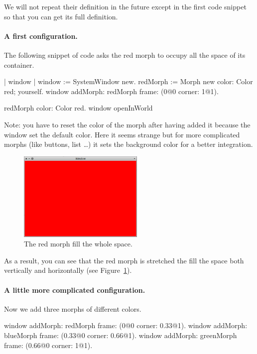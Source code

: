 \documentclass[a4paper,10pt,twoside]{book}
\begin{document}
We will not repeat their definition in the future except in the first code snippet so that you can 
get its full definition. 

\paragraph{A first configuration.}
The following snippet of code asks the red morph to occupy all the space of its container.
\begin{code}{}
| window |
window := SystemWindow new.
redMorph := Morph new color: Color red; yourself.	
window
	addMorph: redMorph
	frame: (0@0 corner: 1@1).
	
redMorph color: Color red.	
window openInWorld
\end{code}
Note: you have to reset the color of the morph after having added it because the window set the default color. Here it seems strange but for more complicated morphs (like buttons, list \dots) it sets the background color for a better integration.

\begin{figure}[ht]\centering
	\includegraphics[width=6cm]{SimpleLayoutExample1}
	\caption{The red morph fill the whole space.}
	\label{fig:simpleLayoutExample1}
\end{figure}

As a result, you can see that the red morph is stretched the fill the space both vertically and horizontally (see Figure~\ref{fig:simpleLayoutExample1}).


\paragraph{A little more complicated configuration.}
Now we add three morphs of different colors. 

\begin{code}{}
window
	addMorph: redMorph
	frame: (0@0 corner: 0.33@1).
window
	addMorph: blueMorph
	frame: (0.33@0 corner: 0.66@1).
window
	addMorph: greenMorph
	frame: (0.66@0 corner: 1@1).
\end{code}
\end{document}

